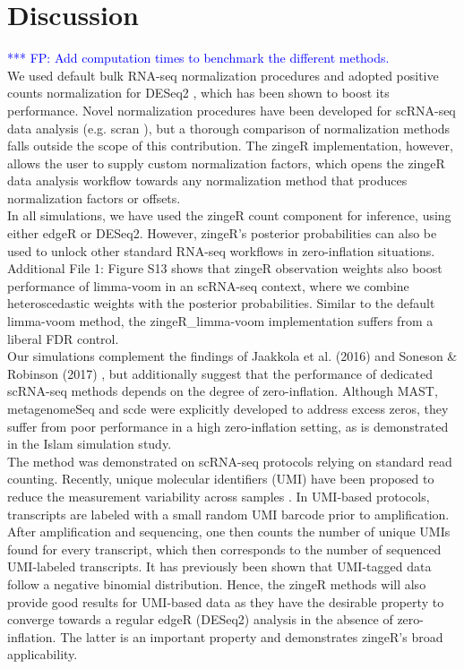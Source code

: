 \documentclass{bmcart}
\newcommand{\fanny}[1]{\textcolor{blue}{*** FP: #1}}
\begin{document}

\section*{Discussion}

\fanny{Add computation times to benchmark the different methods.\\}
We used default bulk RNA-seq normalization procedures and adopted positive counts normalization for DESeq2 \cite{McMurdie2013}, which has been shown to boost its performance.
Novel normalization procedures have been developed for scRNA-seq data analysis (e.g. scran \cite{Lun2016a}), but a thorough comparison of normalization methods falls outside the scope of this contribution.
The zingeR implementation, however, allows the user to supply custom normalization factors, which opens the zingeR data analysis workflow towards any normalization method that produces normalization factors or offsets.\\
In all simulations, we have used the zingeR count component for inference, using either edgeR or DESeq2.
However, zingeR's posterior probabilities can also be used to unlock  other standard RNA-seq workflows in zero-inflation situations. 
Additional File 1: Figure S13 shows that zingeR observation weights also boost performance of limma-voom in an scRNA-seq context, where we combine heteroscedastic weights with the posterior probabilities.
Similar to the default limma-voom method, the zingeR\_limma-voom implementation suffers from a liberal FDR control.\\
Our simulations complement the findings of Jaakkola et al. (2016) \cite{Jaakkola2016} and Soneson \& Robinson (2017) \cite{Soneson2017}, but additionally suggest that the performance of dedicated scRNA-seq methods depends on the degree of zero-inflation.
Although MAST, metagenomeSeq and scde were explicitly developed to address excess zeros, they suffer from poor performance in a high zero-inflation setting, as is demonstrated in the Islam simulation study.\\
The method was demonstrated on scRNA-seq protocols relying on standard read counting. Recently, unique molecular identifiers (UMI) have been proposed to reduce the measurement variability across samples \cite{Islam2013}. In UMI-based protocols, transcripts are labeled with a small random UMI barcode prior to amplification. After amplification and sequencing, one then counts the number of unique UMIs found for every transcript, which then corresponds to the number of sequenced UMI-labeled transcripts.
It has previously been shown \cite{Grun2014} that UMI-tagged data follow a negative binomial distribution.
Hence, the zingeR methods will also provide good results for UMI-based data as they have the desirable property to converge towards a regular edgeR (DESeq2) analysis in the absence of zero-inflation. The latter is an important property and demonstrates zingeR's broad applicability.
\end{document}
